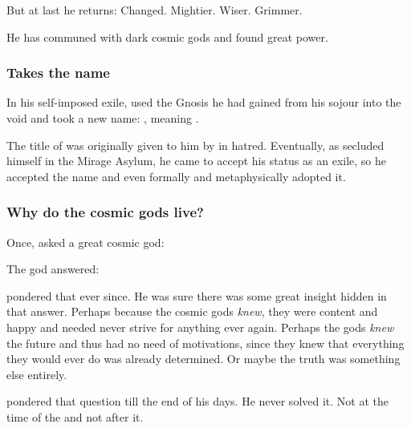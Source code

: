 But at last he returns: 
Changed. 
Mightier. 
Wiser. 
Grimmer. 

He has communed with dark cosmic gods and found great power. 






\subsubsection{Takes the name \Tzeorossh}
In his self-imposed exile, \Ishnaruchaefir used the Gnosis he had gained from his sojour into the void and took a new name:
\quo{\Tzeorossh}, meaning .

The title of  was originally given to him by \Secherdamon in hatred.
Eventually, as \Ishnaruchaefir secluded himself in the Mirage Asylum, he came to accept his status as an exile, so he accepted the name and even formally and metaphysically adopted it.





\subsubsection{Why do the cosmic gods live?}
Once, \Ishnaruchaefir asked a great cosmic god:

The god answered: 

\Ishnaruchaefir pondered that ever since. 
He was sure there was some great insight hidden in that answer. 
Perhaps because the cosmic gods \emph{knew}, they were content and happy and needed never strive for anything ever again. 
Perhaps the gods \emph{knew} the future and thus had no need of motivations, since they knew that everything they would ever do was already determined. 
Or maybe the truth was something else entirely.

\Ishnaruchaefir pondered that question till the end of his days. 
He never solved it.
Not at the time of the \thirdbanewar and not after it. 






